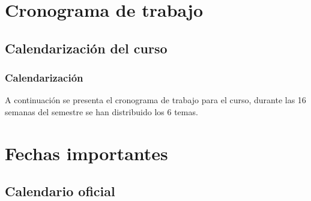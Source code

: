 \section{Cronograma de trabajo}
\subsection{Calendarización del curso}
\begin{frame}
\frametitle{Calendarización}
A continuación se presenta el cronograma de trabajo para el curso, durante las 16 semanas del semestre se han distribuido los 6 temas.
\end{frame}
{

}

\section{Fechas importantes}
\subsection{Calendario oficial}

